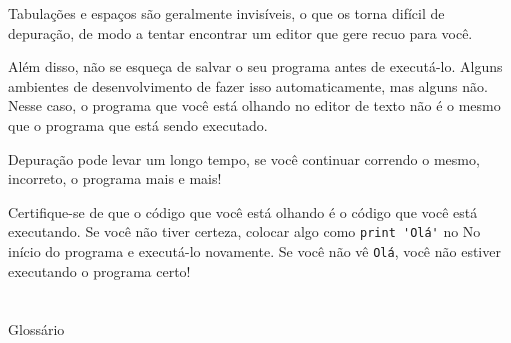 \documentclass[10pt]{book}
\begin{document}
Tabulações e espaços são geralmente invisíveis, o que os torna
difícil de depuração, de modo a tentar encontrar um editor que gere recuo
para você.

Além disso, não se esqueça de salvar o seu programa antes de executá-lo. Alguns
ambientes de desenvolvimento de fazer isso automaticamente, mas alguns não.
Nesse caso, o programa que você está olhando no editor de texto
não é o mesmo que o programa que está sendo executado.

Depuração pode levar um longo tempo, se você continuar correndo o mesmo,
incorreto, o programa mais e mais!

Certifique-se de que o código que você está olhando é o código que você está executando.
Se você não tiver certeza, colocar algo como \verb "print 'Olá'" no
No início do programa e executá-lo novamente. Se você não vê
\Verb "Olá", você não estiver executando o programa certo!




\section{} Glossário
\end{document}

